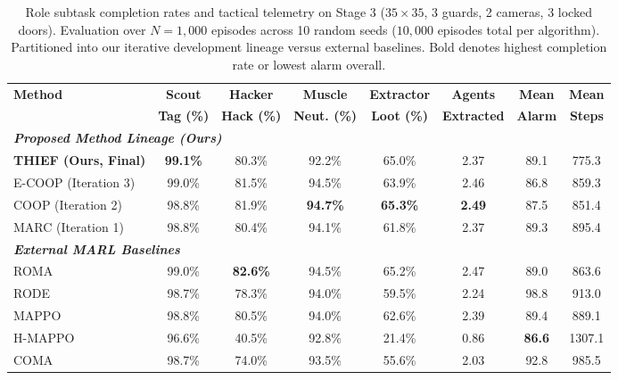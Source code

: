 \begin{table}[htbp]
\centering
\caption{Role subtask completion rates and tactical telemetry on Stage 3 ($35\times 35$, 3 guards, 2 cameras, 3 locked doors). Evaluation over $N=1,\!000$ episodes across 10 random seeds ($10,\!000$ episodes total per algorithm). Partitioned into our iterative development lineage versus external baselines. Bold denotes highest completion rate or lowest alarm overall.}
\label{tab:subtasks_stage3}
\vspace{0.04in}
\footnotesize
\setlength{\tabcolsep}{2.5pt}
\renewcommand{\arraystretch}{1.06}
\begin{tabular}{l ccccc cc}
\toprule
\textbf{Method} & \textbf{Scout} & \textbf{Hacker} & \textbf{Muscle} & \textbf{Extractor} & \textbf{Agents} & \textbf{Mean} & \textbf{Mean} \\
 & \textbf{Tag (\%)} & \textbf{Hack (\%)} & \textbf{Neut. (\%)} & \textbf{Loot (\%)} & \textbf{Extracted} & \textbf{Alarm} & \textbf{Steps} \\
\midrule
\multicolumn{8}{l}{\textit{\textbf{Proposed Method Lineage (Ours)}}} \\
\midrule
\textbf{THIEF (Ours, Final)} & \textbf{99.1\%} & 80.3\% & 92.2\% & 65.0\% & 2.37 & 89.1 & 775.3 \\
E-COOP (Iteration 3) & 99.0\% & 81.5\% & 94.5\% & 63.9\% & 2.46 & 86.8 & 859.3 \\
COOP (Iteration 2) & 98.8\% & 81.9\% & \textbf{94.7\%} & \textbf{65.3\%} & \textbf{2.49} & 87.5 & 851.4 \\
MARC (Iteration 1) & 98.8\% & 80.4\% & 94.1\% & 61.8\% & 2.37 & 89.3 & 895.4 \\
\midrule
\multicolumn{8}{l}{\textit{\textbf{External MARL Baselines}}} \\
\midrule
ROMA \citep{wang2020roma} & 99.0\% & \textbf{82.6\%} & 94.5\% & 65.2\% & 2.47 & 89.0 & 863.6 \\
RODE \citep{wang2021rode} & 98.7\% & 78.3\% & 94.0\% & 59.5\% & 2.24 & 98.8 & 913.0 \\
MAPPO \citep{yu2022surprising} & 98.8\% & 80.5\% & 94.0\% & 62.6\% & 2.39 & 89.4 & 889.1 \\
H-MAPPO \citep{vezhnevets2017feudal} & 96.6\% & 40.5\% & 92.8\% & 21.4\% & 0.86 & \textbf{86.6} & 1307.1 \\
COMA \citep{foerster2018counterfactual} & 98.7\% & 74.0\% & 93.5\% & 55.6\% & 2.03 & 92.8 & 985.5 \\
\bottomrule
\end{tabular}
\end{table}
